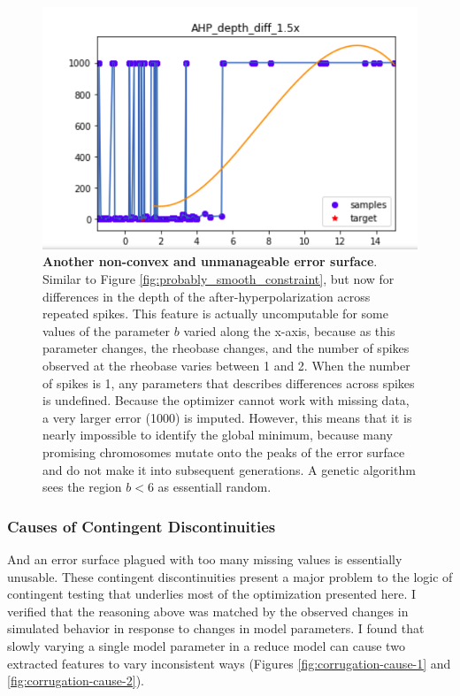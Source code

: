 \begin{figure}
      \centering
      \includegraphics[scale=0.85]{figures/parameter_b_hopeless_surface2.png}
      \caption[A non-convex and unmanageable error surface (2)]{\textbf{Another non-convex and unmanageable error surface}. Similar to Figure  \ref{fig:probably_smooth_constraint}, but now for differences in the depth of the after-hyperpolarization across repeated spikes.
      This feature is actually uncomputable for some values of the parameter $b$ varied along the x-axis, because as this parameter changes, the rheobase changes, and the number of spikes observed at the rheobase varies between 1 and 2.
      When the number of spikes is 1, any parameters that describes differences across spikes is undefined.
      Because the optimizer cannot work with missing data, a very larger error (1000) is imputed.
      However, this means that it is nearly impossible to identify the global minimum, because many promising chromosomes mutate onto the peaks of the error surface and do not make it into subsequent generations.
      A genetic algorithm sees the region $b<6$ as essentiall random.}
      \label{fig:discontinuous_constraint}
\end{figure}

\subsubsection{Causes of Contingent Discontinuities}
And an error surface plagued with too many missing values is essentially unusable.
These contingent discontinuities present a major problem to the logic of contingent testing that underlies most of the optimization presented here.
I verified that the reasoning above was matched by the observed changes in simulated behavior in response to changes in model parameters.
I found that slowly varying a single model parameter in a reduce model can cause two extracted features to vary inconsistent ways (Figures \ref{fig:corrugation-cause-1} and \ref{fig:corrugation-cause-2}).


